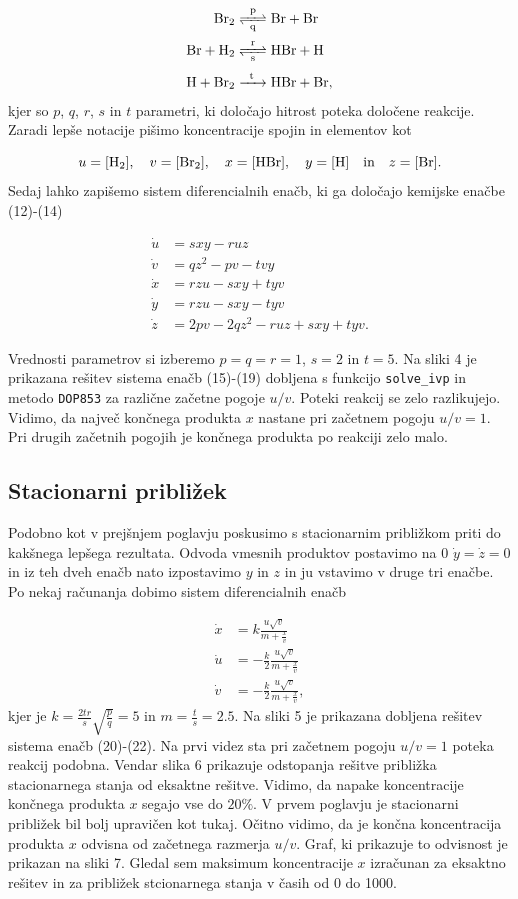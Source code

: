 \documentclass[slovene,11pt,a4paper]{article}
\begin{document}
\begin{align}
\ce{Br2 & <=>[p][q] Br + Br} \\
\ce{Br + H2 & <=>[r][s] HBr + H} \\
\ce{H + Br2 & ->[t] HBr + Br},
\end{align}
kjer so $p$, $q$, $r$, $s$ in $t$ parametri, ki določajo hitrost poteka določene reakcije. Zaradi lepše notacije pišimo koncentracije spojin in elementov kot

\[
u = [\ce{H2}], \quad v = [\ce{Br2}], \quad x = [\ce{HBr}], \quad y = [\ce{H}] \quad \text{in} \quad z = [\ce{Br}].
\]
Sedaj lahko zapišemo sistem diferencialnih enačb, ki ga določajo kemijske enačbe (12)-(14)

\begin{align}
\dot{u} &= sxy - ruz \\
\dot{v} &= qz^2 - pv - tvy \\
\dot{x} &= rzu - sxy + tyv \\
\dot{y} &= rzu - sxy - tyv \\
\dot{z} &= 2pv - 2qz^2 - ruz + sxy + tyv.
\end{align}

Vrednosti parametrov si izberemo $p=q=r=1$, $s=2$ in $t=5$. Na sliki 4 je prikazana rešitev sistema enačb (15)-(19) dobljena s funkcijo \texttt{solve\_ivp} in metodo \texttt{DOP853} za različne začetne pogoje $u/v$. Poteki reakcij se zelo razlikujejo. Vidimo, da največ končnega produkta $x$ nastane pri začetnem pogoju $u/v=1$. Pri drugih začetnih pogojih je končnega produkta po reakciji zelo malo.

\subsection{Stacionarni približek}

Podobno kot v prejšnjem poglavju poskusimo s stacionarnim približkom priti do kakšnega lepšega rezultata. Odvoda vmesnih produktov postavimo na 0 $\dot{y} = \dot{z} = 0$ in iz teh dveh enačb nato izpostavimo $y$ in $z$ in ju vstavimo v druge tri enačbe. Po nekaj računanja dobimo sistem diferencialnih enačb

\begin{align}
\dot{x} &= k \frac{u\sqrt{v}}{m+\frac{x}{v}} \\
\dot{u} &= -\frac{k}{2} \frac{u\sqrt{v}}{m+\frac{x}{v}} \\
\dot{v} &= -\frac{k}{2} \frac{u\sqrt{v}}{m+\frac{x}{v}},
\end{align}
kjer je $k = \frac{2tr}{s}\sqrt{\frac{p}{q}} = 5$ in $m=\frac{t}{s} = 2.5$. Na sliki 5 je prikazana dobljena rešitev sistema enačb (20)-(22). Na prvi videz sta pri začetnem pogoju $u/v=1$ poteka reakcij podobna. Vendar slika 6 prikazuje odstopanja rešitve približka stacionarnega stanja od eksaktne rešitve. Vidimo, da napake koncentracije končnega produkta $x$ segajo vse do $20\%$. V prvem poglavju je stacionarni približek bil bolj upravičen kot tukaj. Očitno vidimo, da je končna koncentracija produkta $x$ odvisna od začetnega razmerja $u/v$. Graf, ki prikazuje to odvisnost je prikazan na sliki 7. Gledal sem maksimum koncentracije $x$ izračunan za eksaktno rešitev in za približek stcionarnega stanja v časih od 0 do 1000.
\end{document}
